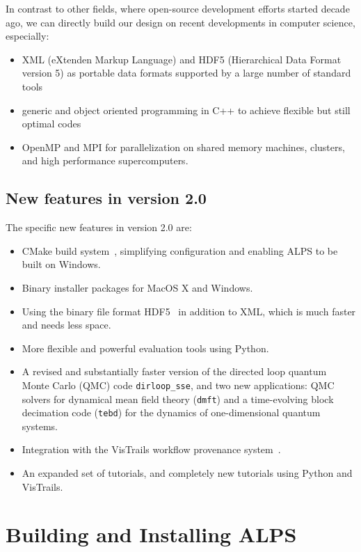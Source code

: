 \documentclass[12pt]{iopart}
\begin{document}
In contrast to other fields, where open-source development efforts started decade ago, we can directly build our design on recent developments in computer science, especially:
\begin{itemize}
\item XML\cite{xml} (eXtenden Markup Language) and HDF5\cite{hdf5} (Hierarchical Data Format version 5)  as portable data formats supported by a large number of standard tools
\item generic and object oriented programming in C++ to achieve flexible but still optimal codes
\item OpenMP\cite{openmp} and MPI\cite{mpi} for parallelization on shared memory machines, clusters, and high performance supercomputers.
\end{itemize} 


\subsection{New features in version 2.0}

The specific new features in version 2.0 are:
 \begin{itemize}
\item CMake build system~\cite{cmake}, simplifying configuration and enabling ALPS to be built on Windows.
\item Binary installer packages for MacOS X and Windows.
\item Using the binary file format HDF5~\cite{hdf5} in addition to XML, which is much faster and needs less space.
\item More flexible and powerful evaluation tools using Python.
\item A revised and substantially faster version of the directed loop quantum Monte Carlo (QMC) code {\tt dirloop\_sse}, and two new applications: QMC solvers for dynamical 
mean field theory ({\tt dmft}) and a time-evolving block decimation code ({\tt tebd}) for the dynamics of one-dimensional quantum systems.
\item Integration with the VisTrails workflow provenance system~\cite{vistrails}.
\item An expanded set of tutorials, and completely new tutorials using Python and VisTrails.
 \end{itemize}
 
 
\section{Building and Installing ALPS} \label{sct:build_and_install}
\end{document}
